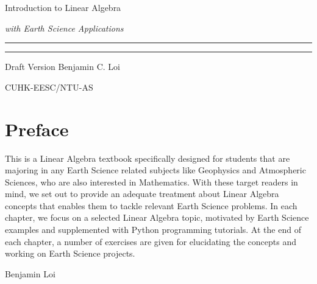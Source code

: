 \begin{titlepage}
    {\Huge\raggedright Introduction to Linear Algebra \par}
    {\Large\raggedright \textit{with Earth Science Applications} \hfill\textcolor{Mahogany}{\rule{3mm}{3mm}} \par}
    \vspace{3mm}\hrule\par
    {\Large\raggedleft Draft Version \hfill Benjamin C. Loi \par}
    \vfill
    {\Large\raggedleft CUHK-EESC/NTU-AS \par}
\end{titlepage}

\chapter*{Preface}
This is a Linear Algebra textbook specifically designed for students that are majoring in any Earth Science related subjects like Geophysics and Atmospheric Sciences, who are also interested in Mathematics. With these target readers in mind, we set out to provide an adequate treatment about Linear Algebra concepts that enables them to tackle relevant Earth Science problems. In each chapter, we focus on a selected Linear Algebra topic, motivated by Earth Science examples and supplemented with Python programming tutorials. At the end of each chapter, a number of exercises are given for elucidating the concepts and working on Earth Science projects. \par
{\raggedleft Benjamin Loi \par}

\tableofcontents